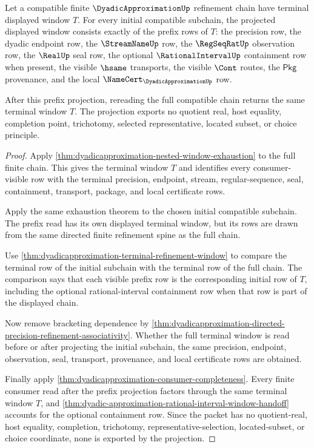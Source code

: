 \begin{theorem}
\label{thm:dyadicapproximation-terminal-window-prefix-projection}
Let a compatible finite $\DyadicApproximationUp$ refinement chain have terminal
displayed window $T$. For every initial compatible subchain, the projected
displayed window consists exactly of the prefix rows of $T$: the precision
row, the dyadic endpoint row, the $\StreamNameUp$ row, the $\RegSeqRatUp$
observation row, the $\RealUp$ seal row, the optional
$\RationalIntervalUp$ containment row when present, the visible $\hsame$
transports, the visible $\Cont$ routes, the $\mathsf{Pkg}$ provenance, and the
local $\NameCert_{\DyadicApproximationUp}$ row.

After this prefix projection, rereading the full compatible chain returns the
same terminal window $T$. The projection exports no quotient real, host
equality, completion point, trichotomy, selected representative, located
subset, or choice principle.
\end{theorem}
\begin{proof}
Apply
\autoref{thm:dyadicapproximation-nested-window-exhaustion} to the full finite
chain. This gives the terminal window $T$ and identifies every consumer-visible
row with the terminal precision, endpoint, stream, regular-sequence, seal,
containment, transport, package, and local certificate rows.

Apply the same exhaustion theorem to the chosen initial compatible subchain.
The prefix read has its own displayed terminal window, but its rows are drawn
from the same directed finite refinement spine as the full chain.

Use \autoref{thm:dyadicapproximation-terminal-refinement-window} to compare the
terminal row of the initial subchain with the terminal row of the full chain.
The comparison says that each visible prefix row is the corresponding initial
row of $T$, including the optional rational-interval containment row when that
row is part of the displayed chain.

Now remove bracketing dependence by
\autoref{thm:dyadicapproximation-directed-precision-refinement-associativity}.
Whether the full terminal window is read before or after projecting the initial
subchain, the same precision, endpoint, observation, seal, transport,
provenance, and local certificate rows are obtained.

Finally apply \autoref{thm:dyadicapproximation-consumer-completeness}. Every
finite consumer read after the prefix projection factors through the same
terminal window $T$, and
\autoref{thm:dyadic-approximation-rational-interval-window-handoff} accounts
for the optional containment row. Since the packet has no quotient-real, host
equality, completion, trichotomy, representative-selection, located-subset, or
choice coordinate, none is exported by the projection.
\end{proof}
